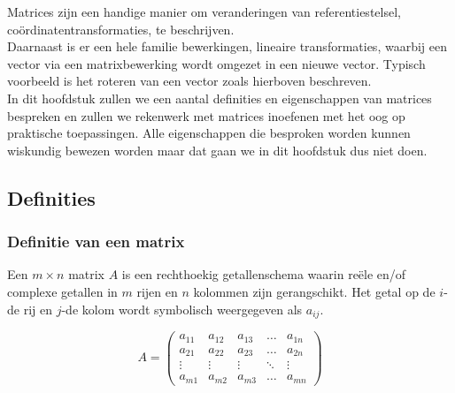 Matrices zijn een handige manier om veranderingen van referentiestelsel, co\"{o}rdinatentransformaties, te beschrijven.\\
Daarnaast is er een hele familie bewerkingen, lineaire transformaties, waarbij een vector via een matrixbewerking wordt omgezet in een nieuwe vector. Typisch voorbeeld is het roteren van een vector zoals hierboven beschreven.\\

In dit hoofdstuk zullen we een aantal definities en eigenschappen van matrices bespreken en zullen we rekenwerk met matrices inoefenen met het oog op praktische toepassingen. Alle eigenschappen die besproken worden kunnen wiskundig bewezen worden maar dat gaan we in dit hoofdstuk dus niet doen.\\

\newpage

\subsection{Definities}


\subsubsection{Definitie van een matrix}

\begin{definitie}
	Een $m \times n$ matrix $A$ is een rechthoekig getallenschema waarin re\"{e}le en/of complexe getallen in $m$ rijen en $n$ kolommen zijn gerangschikt. Het getal op de $i$-de rij en $j$-de kolom wordt symbolisch weergegeven als $a_{ij}$.

\end{definitie}
\[
A= \left( \begin{matrix}
a_{11} & a_{12} & a_{13} & \ldots & a_{1n} \\
a_{21} & a_{22} & a_{23} & \ldots & a_{2n} \\
\vdots & \vdots & \vdots & \ddots & \vdots \\
a_{m1} & a_{m2} & a_{m3} & \ldots & a_{mn}
\end{matrix} \right)
\]


